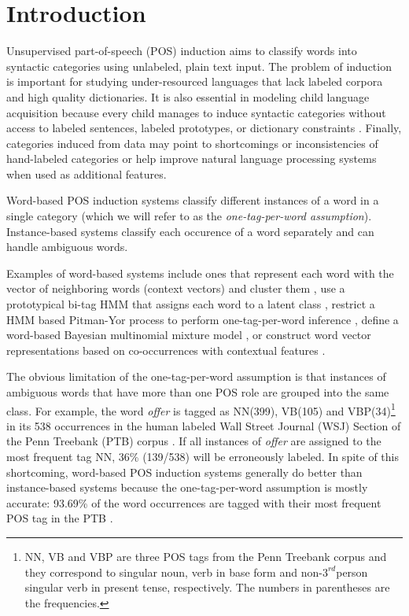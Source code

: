 \section{Introduction} \label{sec:intro}

Unsupervised part-of-speech (POS) induction aims to classify words into
syntactic categories using unlabeled, plain text input.  The problem of
induction is important for studying under-resourced languages that lack labeled
corpora and high quality dictionaries.  It is also essential in modeling child
language acquisition because every child manages to induce syntactic categories
without access to labeled sentences, labeled prototypes, or dictionary
constraints \cite{ambridge2011child}.  Finally, categories induced from data
may point to shortcomings or inconsistencies of hand-labeled categories or help
improve natural language processing systems when used as additional features.

Word-based POS induction systems classify different instances of a
word in a single category (which we will refer to as the {\em
  one-tag-per-word assumption}).  Instance-based systems classify each
occurence of a word separately and can handle ambiguous words.

Examples of word-based systems include ones that represent each word
with the vector of neighboring words (context vectors) and
cluster them
\cite{Schutze:1995:DPT:976973.976994,lamar-EtAl:2010:Short,Lamar:2010:LCU:1870658.1870736},
use a prototypical bi-tag HMM that assigns each word to a latent
class
\cite{Brown:1992:CNG:176313.176316,Clark:2003:CDM:1067807.1067817},
restrict a HMM based Pitman-Yor process to perform one-tag-per-word
inference \cite{blunsom-cohn:2011:ACL-HLT2011}, define a word-based
Bayesian multinomial mixture model
\cite{christodoulopoulos-goldwater-steedman:2011:EMNLP}, or construct
word vector representations based on co-occurrences with contextual
features \cite{yatbaz-sert-yuret:2012:EMNLP-CoNLL}.

The obvious limitation of the one-tag-per-word assumption is that
instances of ambiguous words that have more than one POS role are
grouped into the same class.  For example, the word {\em offer} is
tagged as NN(399), VB(105) and VBP(34)\footnote{NN, VB and VBP are
  three POS tags from the Penn Treebank corpus and they correspond to
  singular noun, verb in base form and non-$3^{rd}$person singular
  verb in present tense, respectively.  The numbers in parentheses are
  the frequencies.} in its 538 occurrences in the human labeled Wall
Street Journal (WSJ) Section of the Penn Treebank (PTB) corpus
\cite{treebank3}.  If all instances of {\em offer} are assigned to the
most frequent tag NN, 36\% (139/538) will be erroneously labeled.  In
spite of this shortcoming, word-based POS induction systems generally
do better than instance-based systems because the one-tag-per-word
assumption is mostly accurate: 93.69\% of the word occurrences are
tagged with their most frequent POS tag in the PTB
\cite{Toutanova:2003:FPT:1073445.1073478}.

